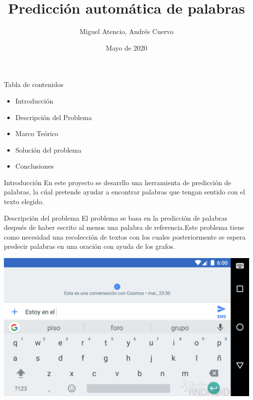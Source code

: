 \documentclass{beamer}
\title{Predicción automática de palabras}
\author{Miguel Atencio, Andrés Cuervo}\textbf{Universidad del Rosario}
\date{Mayo de 2020}
\begin{document}
\maketitle

\begin{frame}{Tabla de contenidos}
    \begin{itemize}
        \item Introducción
        \item Descripción del Problema
        \item Marco Teórico
        \item Solución del problema
        \item Conclusiones
    \end{itemize}
\end{frame}

\begin{frame}{Introducción}
En este proyecto se desarrllo una herramienta de predicción de palabras, la cúal pretende ayudar a encontrar palabras que tengan sentido con el texto elegido.
\end{frame}

\begin{frame}{Descripción del problema}
El problema se basa en la predicción de palabras después de haber escrito al menos 
una palabra de referencia.Este problema tiene como necesidad una recolección de 
textos con los cuales posteriormente se espera predecir palabras en una oración con ayuda 
de los grafos.
    \begin{center}
        \includegraphics[width=.5\textwidth]{g0.jpg}
    \end{center}

\end{frame}
\end{document}

